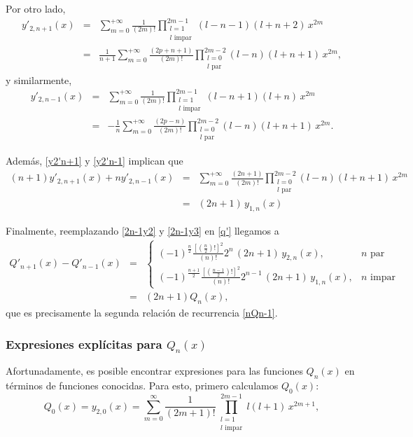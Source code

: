 Por otro lado,
\begin{eqnarray}
y'_{2,n+1}(x)&=&\sum_{m= 0}^{+\infty}\frac{1}{(2m)!}
\prod_{\substack{l=1 \\ l \text{ impar}}}^{2m-1}
(l-n-1)(l+n+2)\,x^{2m} \\
&=&\frac{1}{n+1}\sum_{m= 0}^{+\infty}\frac{(2p+n+1)}{(2m)!}
\prod_{\substack{l=0 \\ l \text{ par}}}^{2m-2}
(l-n)(l+n+1)\,x^{2m}, \label{y2'n+1}
\end{eqnarray}
y similarmente, 
\begin{eqnarray}
y'_{2,n-1}(x)&=&\sum_{m= 0}^{+\infty}\frac{1}{(2m)!}
\prod_{\substack{l=1 \\ l \text{ impar}}}^{2m-1}
(l-n+1)(l+n)\,x^{2m} \\
&=&-\frac{1}{n}\sum_{m= 0}^{+\infty}\frac{(2p-n)}{(2m)!}
\prod_{\substack{l=0 \\ l \text{ par}}}^{2m-2}
(l-n)(l+n+1)\,x^{2m}. \label{y2'n-1}
\end{eqnarray}

Además, \eqref{y2'n+1} y \eqref{y2'n-1} implican que
\begin{eqnarray}
(n+1)y'_{2,n+1}(x)+ny'_{2,n-1}(x)&=&\sum_{m= 0}^{+\infty}\frac{(2n+1)}{(2m)!}
\prod_{\substack{l=0 \\ l \text{ par}}}^{2m-2}
(l-n)(l+n+1)\,x^{2m}\\
&=&(2n+1)\,y_{1,n}(x) \label{2n-1y3}
\end{eqnarray}

Finalmente, reemplazando \eqref{2n-1y2} y \eqref{2n-1y3} en \eqref{q'} llegamos a
\begin{eqnarray}
Q'_{n+1}(x) - Q'_{n-1}(x)&=& 
\begin{cases}
	(-1)^{\frac{n}{2}}\frac{[(\frac{n}{2})!]^2}{(n)!} 2^{n} \,(2n+1)\,y_{2,n}(x) , & n \text{ par}\\
	(-1)^{\frac{n+1}{2}}\frac{\left[\left(\frac{n-1}{2}\right)!\right]^2}{(n)!}2^{n-1}\,(2n+1)\,y_{1,n}(x) , & n \text{ impar}
	\end{cases} \\  
	&=&(2n+1)Q_{n}(x),
\end{eqnarray}
que es precisamente la segunda relación de recurrencia \eqref{nQn-1}.

\subsubsection{Expresiones explícitas para $Q_n(x)$}

Afortunadamente, es posible encontrar expresiones para las funciones $Q_n(x)$ en términos de funciones conocidas. Para esto, primero calculamos $Q_0(x)$:
\begin{equation}
Q_0(x)=y_{2,0}(x)=\sum_{m=0}^\infty\frac{1}{(2m+1)!}
\prod_{\substack{l=1 \\ l \text{ impar}}}^{2m-1}l(l+1)\,x^{2m+1},
\end{equation}

